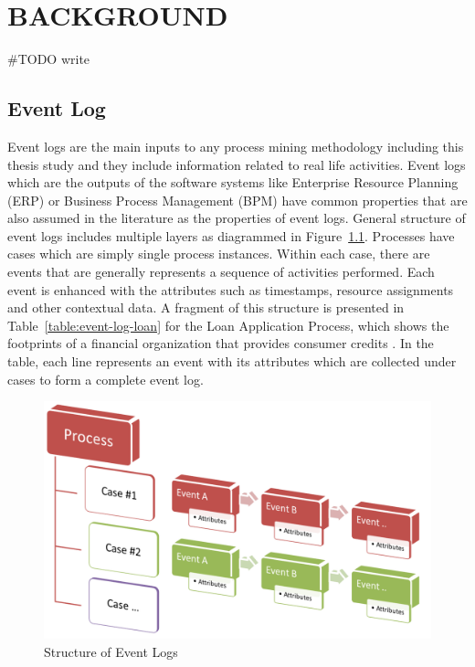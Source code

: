 
\chapter{BACKGROUND}
\label{chp:background}
#TODO write

\section{Event Log}
\label{sec:event-log}
Event logs are the main inputs to any process mining methodology including this thesis study and they include information related to real life activities. Event logs which are the outputs of the software systems like Enterprise Resource Planning (ERP) or Business Process Management (BPM) have common properties that are also assumed in the literature as the properties of event logs. General structure of event logs includes multiple layers as diagrammed in Figure~\ref{fig:event-log-structure}. Processes have cases which are simply single process instances. Within each case, there are events that are generally represents a sequence of activities performed. Each event is enhanced with the attributes such as timestamps, resource assignments and other contextual data. A fragment of this structure is presented in Table~\ref{table:event-log-loan} for the Loan Application Process\cite{loan-app-data}, which shows the footprints of a financial organization that provides consumer credits \cite{buijs2013improving}. In the table, each line represents an event with its attributes which are collected under cases to form a complete event log. 

\begin{figure}
  \centering
  \includegraphics[width=\textwidth]{3_background/event_log_structure}
  \caption{Structure of Event Logs}
  \label{fig:event-log-structure}
\end{figure}

